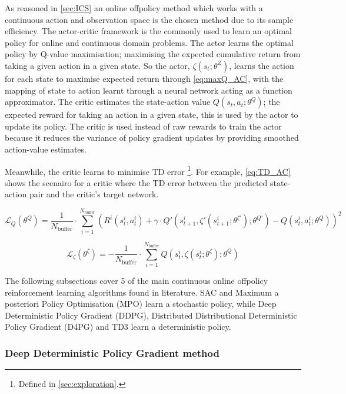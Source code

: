 As reasoned in \autoref{sec:ICS} an online offpolicy method which works with a continuous action and observation space is the chosen method due to its sample efficiency. The actor-critic framework is the commonly used to learn an optimal policy for online and continuous domain problems. The actor learns the optimal policy by Q-value maximisation; maximising the expected cumulative return from taking a given action in a given state. So the actor, \(\zeta(s_t; \theta^Z)\), learns the action for each state to maximise expected return through \autoref{eq:maxQ_AC}, with the mapping of state to action learnt through a neural network acting as a function approximator. The critic estimates the state-action value \(Q(s_t, a_t; \theta^Q)\); the expected reward for taking an action in a given state, this is used by the actor to update its policy. The critic is used instead of raw rewards to train the actor because it reduces the variance of policy gradient updates by providing smoothed action-value estimates.

Meanwhile, the critic learns to minimise TD error \footnote{Defined in \autoref{sec:exploration}.}. For example, \autoref{eq:TD_AC} shows the scenairo for a critic where the TD error between the predicted state-action pair and the critic's target network.

\begin{equation}
    \mathcal{L}_Q(\theta^Q) = \frac{1}{N_{\text{buffer}}} \cdot \sum_{i=1}^{N_{\text{buffer}}}(R^i(s^i_t, a^i_t) + \gamma \cdot Q'(s^i_{t+1}, \zeta'(s^i_{t+1};\theta^{\zeta'});\theta^{Q'}) - Q(s^i_t, a^i_t; \theta^Q))^2
\label{eq:TD_AC}
\end{equation}

\begin{equation}
    \mathcal{L}_\zeta(\theta^\zeta) = - \frac{1}{N_\text{buffer}} \cdot \sum_{i=1}^{N_{\text{buffer}}} Q(s^i_t, \zeta(s^i_t;\theta^\zeta);\theta^Q)
\label{eq:maxQ_AC}
\end{equation}

The following subsections cover 5 of the main continuous online offpolicy reinforcement  learning algorithms found in literature. SAC and Maximum a posteriori Policy Optimisation (MPO) learn a stochastic policy, while Deep Deterministic Policy Gradient (DDPG), Distributed Distributional Deterministic Policy Gradient (D4PG) and TD3 learn a deterministic policy.

\subsubsection{Deep Deterministic Policy Gradient method}
\label{sec:DDPG}

